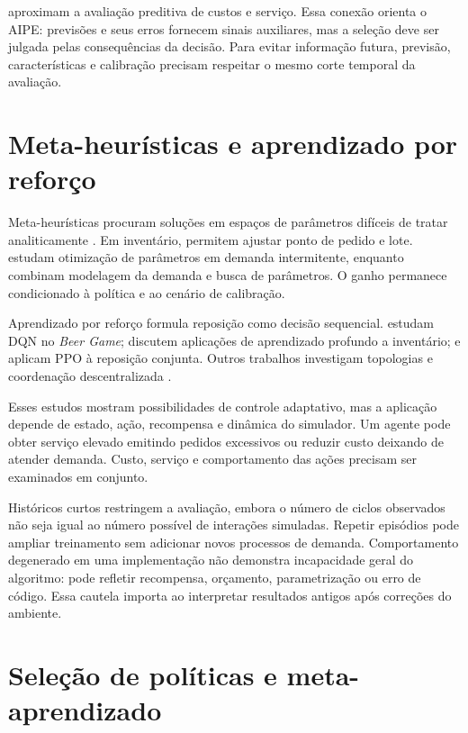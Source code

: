 \citet{TadayonradNdiaye2023KPIDemandForecasting} aproximam a avaliação preditiva de custos e serviço. Essa conexão orienta o AIPE: previsões e seus erros fornecem sinais auxiliares, mas a seleção deve ser julgada pelas consequências da decisão. Para evitar informação futura, previsão, características e calibração precisam respeitar o mesmo corte temporal da avaliação.

\section{Meta-heurísticas e aprendizado por reforço}

Meta-heurísticas procuram soluções em espaços de parâmetros difíceis de tratar analiticamente \citep{Talbi2009Metaheuristics}. Em inventário, permitem ajustar ponto de pedido e lote. \citet{Yuna2023IntermittentMetaheuristics} estudam otimização de parâmetros em demanda intermitente, enquanto \citet{Erkayman2025MarkovInventory} combinam modelagem da demanda e busca de parâmetros. O ganho permanece condicionado à política e ao cenário de calibração.

Aprendizado por reforço formula reposição como decisão sequencial. \citet{Oroojlooyjadid2022BeerGameDQN} estudam DQN no \textit{Beer Game}; \citet{Gijsbrechts2022DRLInventoryMSOM} discutem aplicações de aprendizado profundo a inventário; e \citet{Vanvuchelen2020PPOJointReplenishment} aplicam PPO à reposição conjunta. Outros trabalhos investigam topologias e coordenação descentralizada \citep{Geevers2024MEIODRL,Liu2024HAPPO}.

Esses estudos mostram possibilidades de controle adaptativo, mas a aplicação depende de estado, ação, recompensa e dinâmica do simulador. Um agente pode obter serviço elevado emitindo pedidos excessivos ou reduzir custo deixando de atender demanda. Custo, serviço e comportamento das ações precisam ser examinados em conjunto.

Históricos curtos restringem a avaliação, embora o número de ciclos observados não seja igual ao número possível de interações simuladas. Repetir episódios pode ampliar treinamento sem adicionar novos processos de demanda. Comportamento degenerado em uma implementação não demonstra incapacidade geral do algoritmo: pode refletir recompensa, orçamento, parametrização ou erro de código. Essa cautela importa ao interpretar resultados antigos após correções do ambiente.

\section{Seleção de políticas e meta-aprendizado}
\label{sec:aas_literatura}

